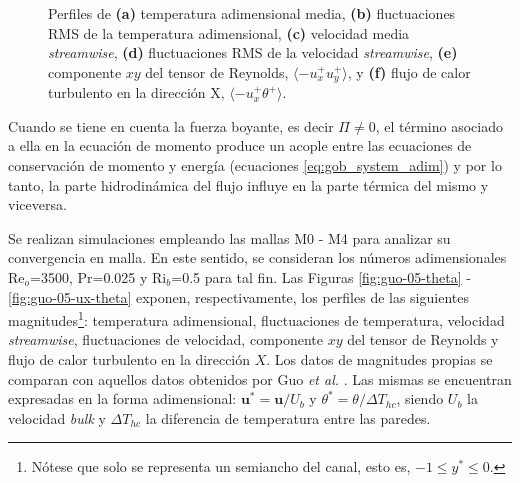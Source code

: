 \begin{figure}[H]
 \caption{Perfiles de \textbf{(a)} temperatura adimensional media, \textbf{(b)} fluctuaciones RMS de la temperatura adimensional, \textbf{(c)} velocidad media \textit{streamwise}, \textbf{(d)} fluctuaciones RMS de la velocidad \textit{streamwise}, \textbf{(e)} componente $xy$ del tensor de Reynolds, $\langle -u^+_x u^+_y \rangle$, y \textbf{(f)} flujo de calor turbulento en la dirección X, $\langle -u^+_x \theta^+ \rangle$.} 
 \label{fig:guo-05}
\end{figure}

Cuando se tiene en cuenta la fuerza boyante, es decir $\Pi \neq 0$, el término asociado a ella en la ecuación de momento produce un acople entre las ecuaciones de conservación de momento y energía (ecuaciones \ref{eq:gob_system_adim}) y por lo tanto, la parte hidrodinámica del flujo influye en la parte térmica del mismo y viceversa. 

Se realizan simulaciones empleando las mallas M0 - M4 para analizar su convergencia en malla. En este sentido, se consideran los números adimensionales Re$_o$=3500, Pr=0.025 y Ri$_b$=0.5 para tal fin. Las Figuras \ref{fig:guo-05-theta} - \ref{fig:guo-05-ux-theta} exponen, respectivamente, los perfiles de las siguientes magnitudes\footnote{Nótese que solo se representa un semiancho del canal, esto es, $-1 \leqslant y^* \leqslant 0$.}: temperatura adimensional, fluctuaciones de temperatura, velocidad \textit{streamwise}, fluctuaciones de velocidad, componente $xy$ del tensor de Reynolds y flujo de calor turbulento en la dirección $X$. Los datos de magnitudes propias se comparan con aquellos datos obtenidos por Guo \textit{et al.} \cite{guo2022direct}. Las mismas se encuentran expresadas en la forma adimensional: $\mathbf{u^*} = \mathbf{u} / U_b$ y $\theta^* = \theta / \Delta T_{hc}$, siendo $U_b$ la velocidad \textit{bulk} y $\Delta T_{hc}$ la diferencia de temperatura entre las paredes.

